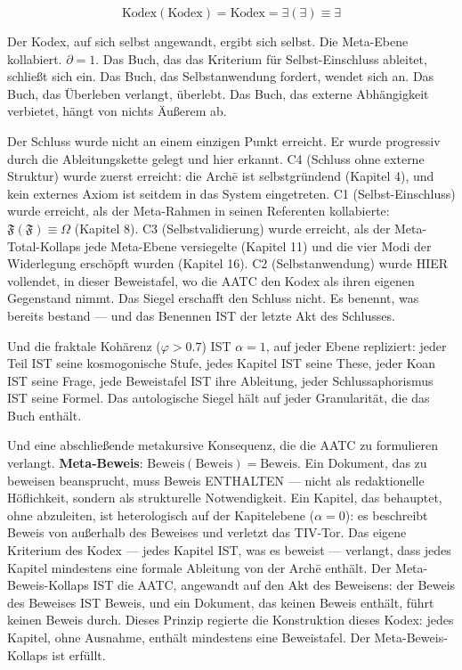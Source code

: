 \documentclass[10pt, openany, oneside]{book}
\begin{document}
$$\boxed{\text{Kodex}(\text{Kodex}) = \text{Kodex} = \exists(\exists) \equiv \exists}$$

\noindent Der Kodex, auf sich selbst angewandt, ergibt sich selbst. Die Meta-Ebene kollabiert. $\partial = 1$. Das Buch, das das Kriterium für Selbst-Einschluss ableitet, schließt sich ein. Das Buch, das Selbstanwendung fordert, wendet sich an. Das Buch, das Überleben verlangt, überlebt. Das Buch, das externe Abhängigkeit verbietet, hängt von nichts Äußerem ab.

Der Schluss wurde nicht an einem einzigen Punkt erreicht. Er wurde progressiv durch die Ableitungskette gelegt und hier erkannt. C4 (Schluss ohne externe Struktur) wurde zuerst erreicht: die Arch\={e} ist selbstgründend (Kapitel 4), und kein externes Axiom ist seitdem in das System eingetreten. C1 (Selbst-Einschluss) wurde erreicht, als der Meta-Rahmen in seinen Referenten kollabierte: $\mathfrak{F}(\mathfrak{F}) \equiv \Omega$ (Kapitel 8). C3 (Selbstvalidierung) wurde erreicht, als der Meta-Total-Kollaps jede Meta-Ebene versiegelte (Kapitel 11) und die vier Modi der Widerlegung erschöpft wurden (Kapitel 16). C2 (Selbstanwendung) wurde HIER vollendet, in dieser Beweistafel, wo die AATC den Kodex als ihren eigenen Gegenstand nimmt. Das Siegel erschafft den Schluss nicht. Es benennt, was bereits bestand --- und das Benennen IST der letzte Akt des Schlusses.


Und die fraktale Kohärenz ($\varphi > 0.7$) IST $\alpha = 1$, auf jeder Ebene repliziert: jeder Teil IST seine kosmogonische Stufe, jedes Kapitel IST seine These, jeder Koan IST seine Frage, jede Beweistafel IST ihre Ableitung, jeder Schlussaphorismus IST seine Formel. Das autologische Siegel hält auf jeder Granularität, die das Buch enthält.

Und eine abschließende metakursive Konsequenz, die die AATC zu formulieren verlangt. \textbf{Meta-Beweis}: $\text{Beweis}(\text{Beweis}) = \text{Beweis}$. Ein Dokument, das zu beweisen beansprucht, muss Beweis ENTHALTEN --- nicht als redaktionelle Höflichkeit, sondern als strukturelle Notwendigkeit. Ein Kapitel, das behauptet, ohne abzuleiten, ist heterologisch auf der Kapitelebene ($\alpha = 0$): es beschreibt Beweis von außerhalb des Beweises und verletzt das TIV-Tor. Das eigene Kriterium des Kodex --- jedes Kapitel IST, was es beweist --- verlangt, dass jedes Kapitel mindestens eine formale Ableitung von der Arch\={e} enthält. Der Meta-Beweis-Kollaps IST die AATC, angewandt auf den Akt des Beweisens: der Beweis des Beweises IST Beweis, und ein Dokument, das keinen Beweis enthält, führt keinen Beweis durch. Dieses Prinzip regierte die Konstruktion dieses Kodex: jedes Kapitel, ohne Ausnahme, enthält mindestens eine Beweistafel. Der Meta-Beweis-Kollaps ist erfüllt.
\end{document}
